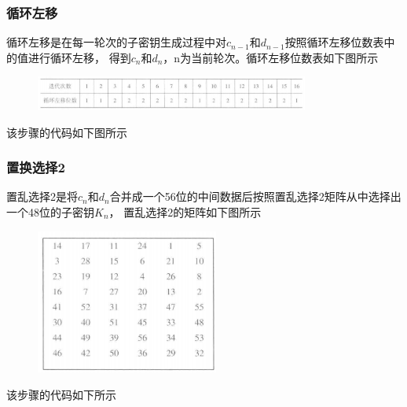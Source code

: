 \documentclass[a4paper,11pt,UTF8]{ctexart}
\newcommand{\bottomcaption}{%
\setlength{\abovecaptionskip}{6pt}%
\setlength{\belowcaptionskip}{6pt}%
\caption}
\newcommand{\xiaowuhao}{\fontsize{9pt}{\baselineskip}\selectfont}   %
\begin{document}
        \subsubsection{循环左移}
            循环左移是在每一轮次的子密钥生成过程中对$c_{n-1}$和$d_{n-1}$按照循环左移位数表中的值进行循环左移，
            得到$c_{n}$和$d_{n}$，n为当前轮次。循环左移位数表如下图所示
            \begin{figure}[H]
                \centering
                \includegraphics[width=9cm]{left_shift.png}
                \bottomcaption{\xiaowuhao{循环左移位数表}}
            \end{figure}
            该步骤的代码如下图所示
            
\newpage
        \subsubsection{置换选择2}
            置乱选择2是将$c_{n}$和$d_{n}$合并成一个56位的中间数据后按照置乱选择2矩阵从中选择出一个48位的子密钥$K_{n}$，
            置乱选择2的矩阵如下图所示
            \begin{figure}[H]
                \centering
                \includegraphics[width=6cm]{PC_2.png}
                \bottomcaption{\xiaowuhao{置乱选择2矩阵}}
            \end{figure}
            该步骤的代码如下所示
            
\end{document}
